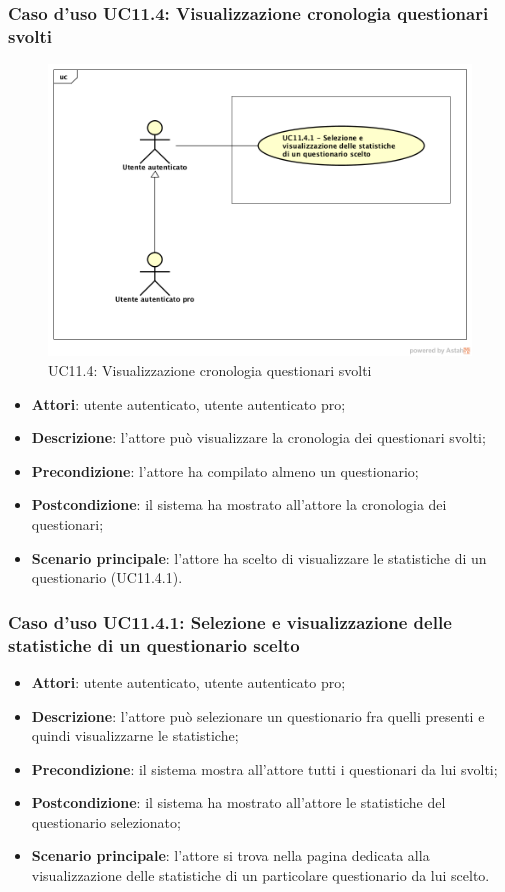 \subsubsection{Caso d'uso UC11.4: Visualizzazione cronologia questionari svolti}
\label{UC11.4}
\begin{figure}[h]
	\centering
	\includegraphics[scale=0.5]{UML/UC11_4.png}
	\caption{UC11.4: Visualizzazione cronologia questionari svolti}
\end{figure}
\begin{itemize}
\item\textbf{Attori}: utente autenticato, utente autenticato pro;
\item\textbf{Descrizione}: l'attore può visualizzare la cronologia dei questionari svolti;
\item\textbf{Precondizione}: l'attore ha compilato almeno un questionario;
\item\textbf{Postcondizione}: il sistema ha mostrato all'attore la cronologia dei questionari;
\item\textbf{Scenario principale}: l'attore ha scelto di visualizzare le statistiche di un questionario (UC11.4.1).
\end{itemize}

\subsubsection{Caso d'uso UC11.4.1: Selezione e visualizzazione delle statistiche di un questionario scelto}
\begin{itemize}
\item\textbf{Attori}: utente autenticato, utente autenticato pro;
\item\textbf{Descrizione}: l'attore può selezionare un questionario fra quelli presenti e quindi visualizzarne le statistiche;
\item\textbf{Precondizione}: il sistema mostra all'attore tutti i questionari da lui svolti;
\item\textbf{Postcondizione}: il sistema ha mostrato all'attore le statistiche del questionario selezionato;
\item\textbf{Scenario principale}: l'attore si trova nella pagina dedicata alla visualizzazione delle statistiche di un particolare questionario da lui scelto.
\end{itemize}

